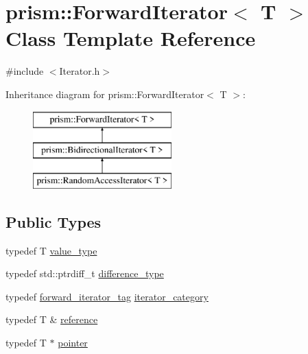 \hypertarget{classprism_1_1_forward_iterator}{}\section{prism\+:\+:Forward\+Iterator$<$ T $>$ Class Template Reference}
\label{classprism_1_1_forward_iterator}


{\ttfamily \#include $<$Iterator.\+h$>$}

Inheritance diagram for prism\+:\+:Forward\+Iterator$<$ T $>$\+:\begin{figure}[H]
\begin{center}
\leavevmode
\includegraphics[height=3.000000cm]{classprism_1_1_forward_iterator}
\end{center}
\end{figure}
\subsection*{Public Types}
\begin{DoxyCompactItemize}
\item 
typedef T \hyperlink{classprism_1_1_forward_iterator_a7a28958d2cf2ea2613c6f0f011759781}{value\+\_\+type}
\item 
typedef std\+::ptrdiff\+\_\+t \hyperlink{classprism_1_1_forward_iterator_a8c90486e85c02351c2e957ba3247ab10}{difference\+\_\+type}
\item 
typedef \hyperlink{structprism_1_1forward__iterator__tag}{forward\+\_\+iterator\+\_\+tag} \hyperlink{classprism_1_1_forward_iterator_a12bfb01d6fffd1595296c3625ee1f825}{iterator\+\_\+category}
\item 
typedef T \& \hyperlink{classprism_1_1_forward_iterator_a4f7bff2c238f447c1537c74fe09f8935}{reference}
\item 
typedef T $\ast$ \hyperlink{classprism_1_1_forward_iterator_af50dd6e13f3cea3ee3b2332e48996502}{pointer}
\end{DoxyCompactItemize}
